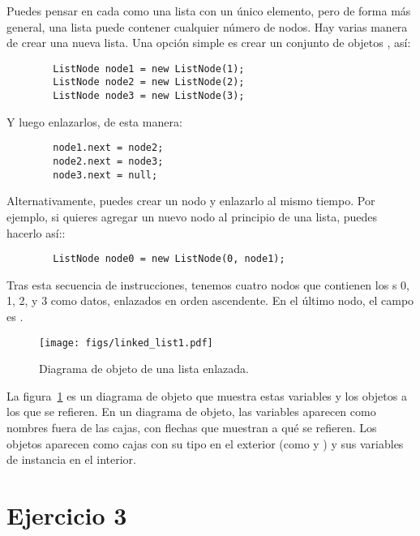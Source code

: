 \documentclass[12pt]{book}
\theoremstyle{exercise}
\begin{document}
Puedes pensar en cada  como una lista con un único elemento,
pero de forma más general, una lista puede contener cualquier número de nodos. Hay
varias manera de crear una nueva lista. Una opción simple es crear un conjunto de
objetos , así:

\begin{verbatim}
        ListNode node1 = new ListNode(1);
        ListNode node2 = new ListNode(2);
        ListNode node3 = new ListNode(3);
\end{verbatim}

Y luego enlazarlos, de esta manera:

\begin{verbatim}
        node1.next = node2;
        node2.next = node3;
        node3.next = null;
\end{verbatim}

Alternativamente, puedes crear un nodo y enlazarlo al mismo tiempo. Por
ejemplo, si quieres agregar un nuevo nodo al principio de una lista, puedes
hacerlo así::

\begin{verbatim}
        ListNode node0 = new ListNode(0, node1);
\end{verbatim}

Tras esta secuencia de instrucciones, tenemos cuatro nodos que contienen los
s 0, 1, 2, y 3 como datos, enlazados en orden ascendente. En el
último nodo, el campo  es .

\begin{figure}
\centering
\texttt{[image: figs/linked\_list1.pdf]}
\caption{Diagrama de objeto de una lista enlazada.}
\label{linkedlistfig}
\end{figure}


La figura~\ref{linkedlistfig} es un diagrama de objeto que muestra estas
variables y los objetos a los que se refieren.  En un diagrama de objeto,
las variables aparecen como nombres fuera de las cajas, con flechas que muestran
a qué se refieren. Los objetos aparecen como cajas con su tipo en el exterior
(como  y ) y sus variables de instancia en el interior.


\section{Ejercicio 3}
\label{exercise3}
\end{document}
